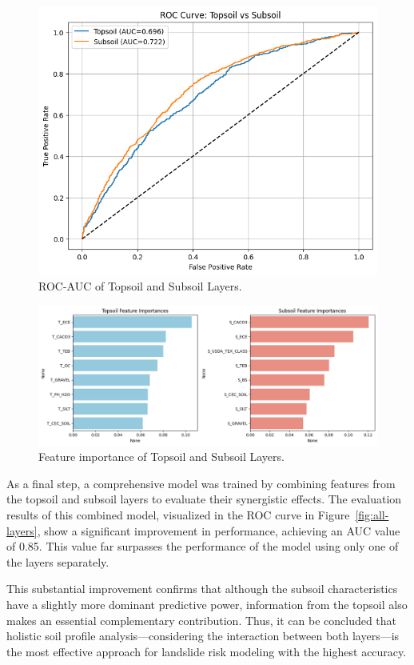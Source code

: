 \begin{figure}[htbp]
    \centerline{\includegraphics[width=\linewidth]{fig7.png}}
    \caption{ROC-AUC of Topsoil and Subsoil Layers.}
    \label{fig:sub-top}
\end{figure}
\begin{figure}[htbp]
    \centerline{\includegraphics[width=\linewidth]{fig8.png}}
    \caption{Feature importance of Topsoil and Subsoil Layers.}
    \label{fig:feature-importance-top-sub}
\end{figure}

As a final step, a comprehensive model was trained by combining features from the topsoil and subsoil layers to evaluate their synergistic effects. The evaluation results of this combined model, visualized in the ROC curve in Figure~\ref{fig:all-layers}, show a significant improvement in performance, achieving an AUC value of 0.85. This value far surpasses the performance of the model using only one of the layers separately.

This substantial improvement confirms that although the subsoil characteristics have a slightly more dominant predictive power, information from the topsoil also makes an essential complementary contribution. Thus, it can be concluded that holistic soil profile analysis---considering the interaction between both layers---is the most effective approach for landslide risk modeling with the highest accuracy.

